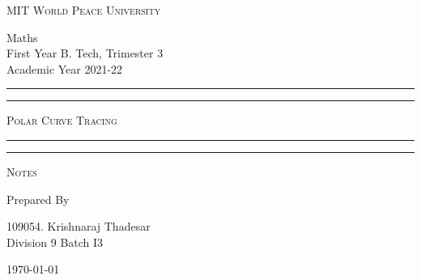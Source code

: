 \documentclass[12pt]{article}
\begin{document}
	
	\begin{titlepage} 
		\centering 
		
		
		\huge\textsc{
			MIT World Peace University
		}\\
	
		\vspace{0.75\baselineskip} %
		
		\LARGE{
			Maths\\
			First Year B. Tech, Trimester 3\\
			Academic Year 2021-22
		}
		
		\vfill %
		
		
		\rule{\textwidth}{1.6pt}\vspace*{-\baselineskip}\vspace*{2pt}
		\rule{\textwidth}{0.6pt}
		\vspace{0.75\baselineskip} %
		
		
		
		\huge{\textsc{
        Polar Curve Tracing
        }} \\
		
		
		
		\vspace{0.5\baselineskip} %
		\rule{\textwidth}{0.6pt}\vspace*{-\baselineskip}\vspace*{2.8pt}
		\rule{\textwidth}{1.6pt}
		
		\vspace{1\baselineskip} %

			
		\LARGE\textsc{
			Notes
		} %
		\vfill
		
		
		Prepared By
		\vspace{0.5\baselineskip} %
		
		\Large{
			109054. Krishnaraj Thadesar\\
			\vspace{1cm}
			Division 9 Batch I3
		}
		
		
		\vspace{0.5\baselineskip} %
		\today

	\end{titlepage}
\end{document}
